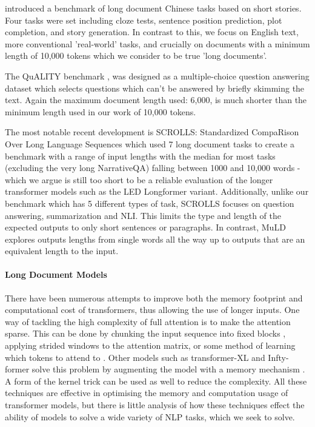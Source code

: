\documentclass[10pt, a4paper]{article}
\begin{document}
 introduced a benchmark of long document Chinese tasks based on short stories. Four tasks were set including cloze tests, sentence position prediction, plot completion, and story generation. In contrast to this, we focus on English text, more conventional 'real-world' tasks, and crucially on documents with a minimum length of 10,000 tokens which we consider to be true 'long documents'.

The QuALITY benchmark \cite{Pang_2021}, was designed as a multiple-choice question answering dataset which selects questions which can't be answered by briefly skimming the text. Again the maximum document length used: 6,000, is much shorter than the minimum length used in our work of 10,000 tokens.

The most notable recent development is SCROLLS: Standardized CompaRison Over Long Language Sequences \cite{Shaham_2022scrolls} which used 7 long document tasks to create a benchmark with a range of input lengths with the median for most tasks (excluding the very long NarrativeQA) falling between 1000 and 10,000 words - which we argue is still too short to be a reliable evaluation of the longer transformer models such as the LED Longformer variant. Additionally, unlike our benchmark which has 5 different types of task, SCROLLS focuses on question answering, summarization and NLI. This limits the type and length of the expected outputs to only short sentences or paragraphs. In contrast, MuLD explores outputs lengths from single words all the way up to outputs that are an equivalent length to the input.

\paragraph{Long Document Models}
There have been numerous attempts to improve both the memory footprint and computational cost of transformers, thus allowing the use of longer inputs. One way of tackling the high complexity of full attention is to make the attention sparse. This can be done by chunking the input sequence into fixed blocks \cite{qiu-etal-2020-blockwise}, applying strided windows to the attention matrix, or some method of learning which tokens to attend to \cite{Kitaev_2020}. Other models such as transformer-XL \cite{Dai_2019transformerxl} and Infty-former \cite{Martins_2021infty} solve this problem by augmenting the model with a memory mechanism \cite{Katharopoulos_2020transformersarernns}. A form of the kernel trick can be used as well to reduce the complexity. All these techniques are effective in optimising the memory and computation usage of transformer models, but there is little analysis of how these techniques effect the ability of models to solve a wide variety of NLP tasks, which we seek to solve. 
\end{document}
